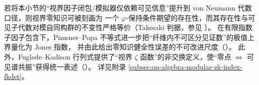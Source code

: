 \begin{remark}\label{rem:xi-hzom-opalgebra-takesaki-index-fkdet}
若将本小节的“视界因子闭包/模拟器仅依赖可见信息”提升到 von Neumann 代数口径，则视界零知识可被刻画为
一个 \(\varphi\)-保持条件期望的存在性，而其存在性与可见子代数对模自同构群的不变性严格等价（Takesaki 判据，参见 \cite{AccardiCecchini1982ConditionalExpectationsTakesaki,Takesaki1972ConditionalExpectationsVNA}）。
在有限指数子因子包含下，Pimsner--Popa 不等式进一步把“纤维内不可区分见证数”的极值上界量化为 Jones 指数，
并由此给出零知识健全性误差的不可改进尺度（\cite{PimsnerPopa1986EntropyIndexSubfactors}）。
此外，Fuglede--Kadison 行列式提供了“视界 \(\zeta\) 函数”的非交换定义，使“零点 \(\Leftrightarrow\) 可见谱共振”获得统一表述（\cite{FugledeKadison1951DeterminantsTraceFiniteFactors}）。
详见附录 \ref{subsec:op-algebra-modular-zk-index-fkdet}。
\end{remark}

\endinput
